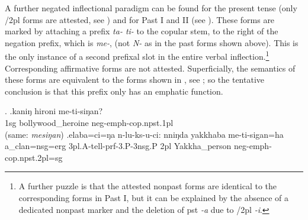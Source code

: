  
A further negated inflectional paradigm can be found for the present tense (only {/2pl} forms are attested, see \Next) and for Past I and II (see ). These forms are marked by attaching a prefix \emph{ta- \ti ti-} to the copular stem, to the right of the negation prefix, which is  \emph{me-}, (not \emph{N-} as in the past forms shown above). This is the only instance of a second prefixal slot in the entire verbal inflection.\footnote{A further puzzle is that the attested nonpast forms are identical to the corresponding forms in Past I, but it can be explained by the absence of a dedicated nonpast marker and the deletion of {\sc pst} \emph{-a} due to {/2pl} \emph{-i}.}  Corresponding affirmative forms are not attested. Superficially, the semantics of these forms are equivalent to the forms shown in , see \Next[a]; so the tentative conclusion is that this prefix only has an emphatic function.

\ex. \ag.kaniŋ hironi me-ti-siŋan?\\
{\sc 1sg} bollywood\_heroine {\sc neg-emph-cop.npst.1pl}\\
 (same: \emph{mesiŋan})
\bg.elaba=ci=ŋa n-lu-ks-u-ci:     nniŋda yakkhaba    me-ti-sigan=ha\\
a\_clan{\sc =nsg=erg} {\sc 3pl.A-}tell{\sc -prf-3.P-3nsg.P}  {\sc 2pl} Yakkha\_person {\sc neg-emph-cop.npst.2pl=sg}\\
 

